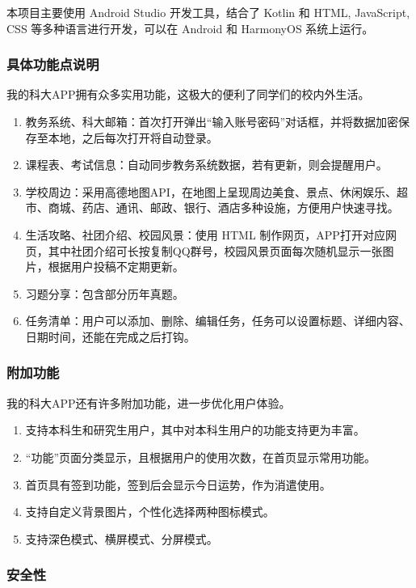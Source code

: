 本项目主要使用 Android Studio 开发工具，结合了 Kotlin 和 HTML, JavaScript, CSS 等多种语言进行开发，可以在 Android 和 HarmonyOS 系统上运行。

\subsubsection{具体功能点说明}

我的科大APP拥有众多实用功能，这极大的便利了同学们的校内外生活。

\begin{enumerate}
  \item 教务系统、科大邮箱：首次打开弹出“输入账号密码”对话框，并将数据加密保存至本地，之后每次打开将自动登录。
  \item 课程表、考试信息：自动同步教务系统数据，若有更新，则会提醒用户。
  \item 学校周边：采用高德地图API，在地图上呈现周边美食、景点、休闲娱乐、超市、商城、药店、通讯、邮政、银行、酒店多种设施，方便用户快速寻找。
  \item 生活攻略、社团介绍、校园风景：使用 HTML 制作网页，APP打开对应网页，其中社团介绍可长按复制QQ群号，校园风景页面每次随机显示一张图片，根据用户投稿不定期更新。
  \item 习题分享：包含部分历年真题。
  \item 任务清单：用户可以添加、删除、编辑任务，任务可以设置标题、详细内容、日期时间，还能在完成之后打钩。
\end{enumerate}

\subsubsection{附加功能}

我的科大APP还有许多附加功能，进一步优化用户体验。

\begin{enumerate}
  \item 支持本科生和研究生用户，其中对本科生用户的功能支持更为丰富。
  \item “功能”页面分类显示，且根据用户的使用次数，在首页显示常用功能。
  \item 首页具有签到功能，签到后会显示今日运势，作为消遣使用。
  \item 支持自定义背景图片，个性化选择两种图标模式。
  \item 支持深色模式、横屏模式、分屏模式。
\end{enumerate}

\subsubsection{安全性}

